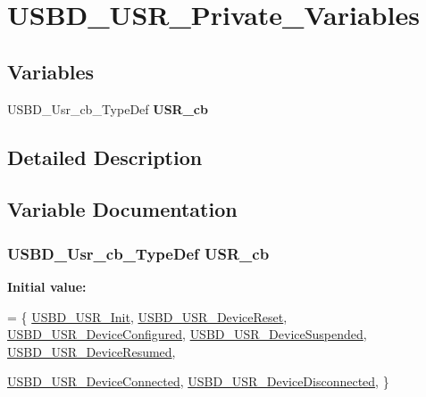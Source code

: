 \hypertarget{group__USBD__USR__Private__Variables}{\section{U\-S\-B\-D\-\_\-\-U\-S\-R\-\_\-\-Private\-\_\-\-Variables}
\label{group__USBD__USR__Private__Variables}
}
\subsection*{Variables}
\begin{DoxyCompactItemize}
\item 
U\-S\-B\-D\-\_\-\-Usr\-\_\-cb\-\_\-\-Type\-Def {\bfseries U\-S\-R\-\_\-cb}
\end{DoxyCompactItemize}


\subsection{Detailed Description}


\subsection{Variable Documentation}
\hypertarget{group__USBD__USR__Private__Variables_ga52488b10fa93886ec45cc041df9a3501}{
\subsubsection[{U\-S\-R\-\_\-cb}]{\setlength{\rightskip}{0pt plus 5cm}U\-S\-B\-D\-\_\-\-Usr\-\_\-cb\-\_\-\-Type\-Def U\-S\-R\-\_\-cb}}\label{group__USBD__USR__Private__Variables_ga52488b10fa93886ec45cc041df9a3501}
{\bfseries Initial value\-:}
\begin{DoxyCode}
=
\{
  \hyperlink{group__USBD__USR__Private__Functions_ga439704d4d2254602e672f6ce0528e3eb}{USBD\_USR\_Init},
  \hyperlink{group__USBD__USR__Private__Functions_gac10ea223f86ed47e7619b25ab71ed83a}{USBD\_USR\_DeviceReset},
  \hyperlink{group__USBD__USR__Private__Functions_ga8fad6d5efb792b500cfd1f5d0c970351}{USBD\_USR\_DeviceConfigured},
  \hyperlink{group__USBD__USR__Private__Functions_ga62204dce5d51990ef90d52f0c8efc9a7}{USBD\_USR\_DeviceSuspended},
  \hyperlink{group__USBD__USR__Private__Functions_ga811ae379ad06261ef3fdbd123cff427e}{USBD\_USR\_DeviceResumed},
  
  
  \hyperlink{group__USBD__USR__Private__Functions_gac680d8462dc3339d7f5a84378957cfd2}{USBD\_USR\_DeviceConnected},
  \hyperlink{group__USBD__USR__Private__Functions_gaea31856943d8abb8205004028cc817bd}{USBD\_USR\_DeviceDisconnected},    
\}
\end{DoxyCode}
